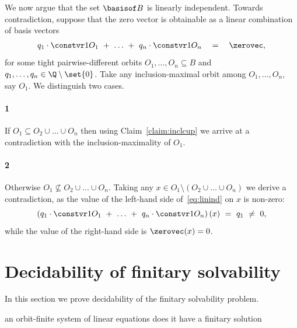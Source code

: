 We now argue that the set $\basisof B$ is linearly independent.
Towards contradiction, suppose that the zero vector is obtainable as a linear combination of basis vectors
%
\begin{align} \label{eq:linind}
q_{1} \cdot \constvr 1 {O_1} \ + \ \ldots \ + \  
q_{n} \cdot \constvr 1 {O_n} \quad = \quad \zerovec,
\end{align}
%
for some tight pairwise-different orbits $O_1, \ldots, O_n \subseteq B$ and 
$q_{1}, \ldots, q_{n} \in \Q\setminus\set{0}$.
Take any inclusion-maximal orbit among $O_1, \ldots, O_n$, say $O_1$.
We distinguish two cases.


\paragraph{1} 
If $O_1 \subseteq O_2 \cup \ldots \cup O_n$ then
using Claim~\ref{claim:inclcup} we arrive at a contradiction with the inclusion-maximality of $O_1$.


\paragraph{2} 
Otherwise $O_1 \not\subseteq O_2 \cup \ldots \cup O_n$.
Taking any $x \in O_1 \setminus (O_2 \cup \ldots \cup O_n)$ we derive a contradiction, as the  value 
of the left-hand side of~\eqref{eq:linind}  on $x$ is non-zero:
\[
\left(q_{1} \cdot \constvr 1 {O_1} \ + \ \ldots \ + \  
q_{n} \cdot \constvr 1 {O_n}\right) (x) \ = \ q_1 \ \neq \ 0,
\]
while the value of the right-hand side is $\zerovec(x) = 0$. %





\section{Decidability of finitary solvability} \label{sec:fin-solv}

In this section we prove decidability of the finitary solvability problem.

\prob{\finsolvname$(\Q)$}
{an orbit-finite system of linear equations} %
{does it have a finitary solution} %


